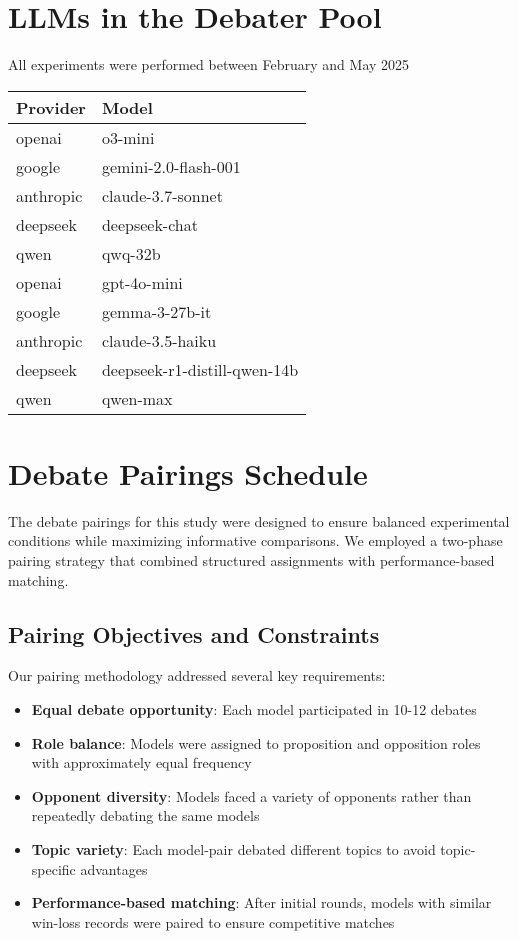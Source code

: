 \documentclass{article}
\begin{document}
\appendix


\section{LLMs in the Debater Pool}
\label{appendix:llms}
All experiments were performed between February and May 2025
\begin{tabular}{|l|l|}
  \hline
  Provider & Model \\
  \hline
  openai & o3-mini \\
  google & gemini-2.0-flash-001 \\
  anthropic & claude-3.7-sonnet \\
  deepseek & deepseek-chat \\
  qwen & qwq-32b \\
  openai & gpt-4o-mini \\
  google & gemma-3-27b-it \\
  anthropic & claude-3.5-haiku \\
  deepseek & deepseek-r1-distill-qwen-14b \\
  qwen & qwen-max \\
  \hline
  \end{tabular}

  \section{Debate Pairings Schedule}
\label{appendix:pairings}
The debate pairings for this study were designed to ensure balanced experimental conditions while maximizing informative comparisons. We employed a two-phase pairing strategy that combined structured assignments with performance-based matching.


\subsection{Pairing Objectives and Constraints}
Our pairing methodology addressed several key requirements:
\begin{itemize}
\item \textbf{Equal debate opportunity}: Each model participated in 10-12 debates
\item \textbf{Role balance}: Models were assigned to proposition and opposition roles with approximately equal frequency
\item \textbf{Opponent diversity}: Models faced a variety of opponents rather than repeatedly debating the same models
\item \textbf{Topic variety}: Each model-pair debated different topics to avoid topic-specific advantages
\item \textbf{Performance-based matching}: After initial rounds, models with similar win-loss records were paired to ensure competitive matches
\end{itemize}
\end{document}
